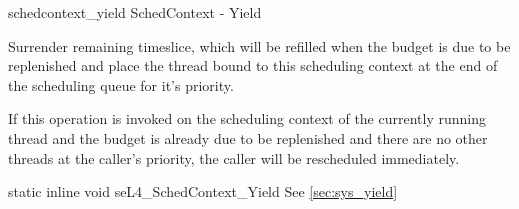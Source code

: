 %
%
%
%

\apidoc
{schedcontext_yield}
{SchedContext - Yield}
{Surrender remaining timeslice, which will be refilled when the budget is due to be replenished and place the thread bound to this scheduling context at the end of the scheduling queue for it's priority. 

If this operation is invoked on the scheduling context of the currently running thread and the budget is already due to be replenished and there are no other threads at the caller's priority, the caller will be rescheduled immediately.}
{static inline void seL4\_SchedContext\_Yield}
{
}
{\noret}
{See \autoref{sec:sys_yield}}
